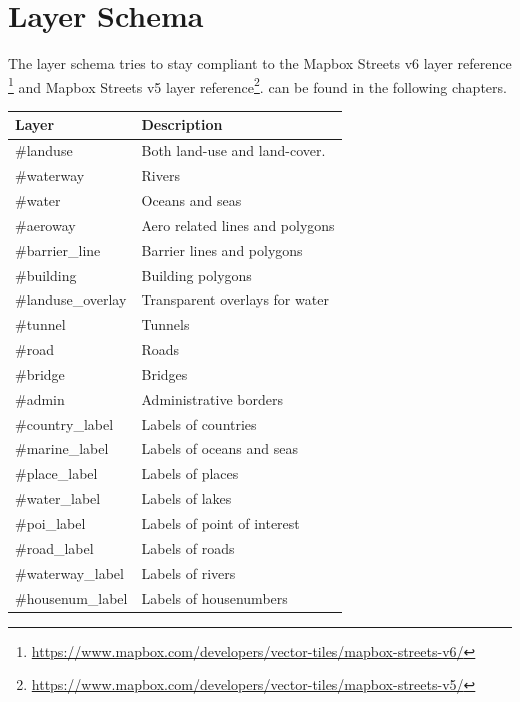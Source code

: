\newpage
\section{Layer Schema}\label{layer-schema}

The layer schema tries to stay compliant to the Mapbox Streets v6 layer reference \footnote{\url{https://www.mapbox.com/developers/vector-tiles/mapbox-streets-v6/}} and Mapbox Streets v5 layer reference\footnote{\url{https://www.mapbox.com/developers/vector-tiles/mapbox-streets-v5/}}.
can be found in the following chapters.

\begin{flushleft}
    \begin{tabular}{ll}
    \hline
     Layer             & Description                     \\
    \hline
    \#landuse          & Both land-use and land-cover.   \\
    \#waterway         & Rivers                          \\
    \#water            & Oceans and seas                 \\
    \#aeroway          & Aero related lines and polygons \\
    \#barrier\_line    & Barrier lines and polygons      \\
    \#building         & Building polygons               \\
    \#landuse\_overlay & Transparent overlays for water  \\
    \#tunnel           & Tunnels                         \\
    \#road             & Roads                           \\
    \#bridge           & Bridges                         \\
    \#admin            & Administrative borders          \\
    \#country\_label   & Labels of countries             \\
    \#marine\_label    & Labels of oceans and seas       \\
    \#place\_label     & Labels of places                \\
    \#water\_label     & Labels of lakes                 \\
    \#poi\_label       & Labels of point of interest     \\
    \#road\_label      & Labels of roads                 \\
    \#waterway\_label  & Labels of rivers                \\
    \#housenum\_label  & Labels of housenumbers          \\
    \end{tabular}
\end{flushleft}

